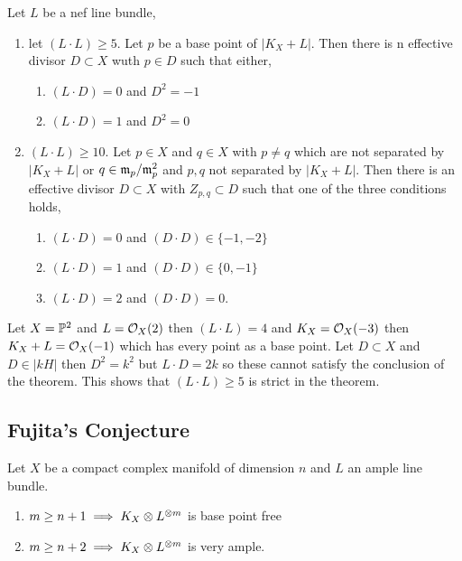 \documentclass[12pt]{article}
\begin{document}
\begin{theorem}[Reider]
Let $L$ be a nef line bundle,
\begin{enumerate}
\item let $(L \cdot L) \ge 5$. Let $p$ be a base point of $|K_X + L|$. Then there is n effective divisor $D \subset X$ wuth $p \in D$ such that either,
\begin{enumerate}
\item $(L \cdot D) = 0$ and $D^2 = - 1$
\item $(L \cdot D) = 1$ and $D^2 = 0$ 
\end{enumerate}
\item $(L \cdot L) \ge 10$. Let $p \in X$ and $q \in X$ with $p \neq q$ which are not separated by $|K_X + L|$ or $q \in \m_p / \m_p^2$ and $p,q$ not separated by $|K_X + L|$. Then there is an effective divisor $D \subset X$ with $Z_{p,q} \subset D$ such that one of the three conditions holds,
\begin{enumerate}
\item $(L \cdot D) = 0$ and $(D \cdot D) \in \{ -1, - 2 \}$ 
\item $(L \cdot D) = 1$ and $(D \cdot D) \in \{ 0, -1 \}$
\item $(L \cdot D) = 2$ and $(D \cdot D) = 0$.
\end{enumerate}
\end{enumerate}
\end{theorem}

\begin{example}
Let $X = \P^2$ and $L = \struct{X}(2)$ then $(L \cdot L) = 4$ and $K_X = \struct{X}(-3)$ then $K_X + L = \struct{X}(-1)$ which has every point as a base point. Let $D \subset X$ and $D \in | k H|$ then $D^2 = k^2$ but $L \cdot D = 2k$ so these cannot satisfy the conclusion of the theorem. This shows that $(L \cdot L) \ge 5$ is strict in the theorem.
\end{example}

\subsection{Fujita's Conjecture}


\begin{conj}[Fujita 1985]
Let $X$ be a compact complex manifold of dimension $n$ and $L$ an ample line bundle.
\begin{enumerate}
\item $m \ge n + 1 \implies K_X \ot L^{\ot m}$ is base point free
\item $m \ge n + 2 \implies K_X \ot L^{\ot m}$ is very ample.
\end{enumerate}
\end{conj}
\end{document}
